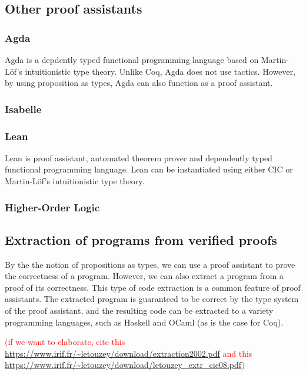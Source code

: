 \subsection{Other proof assistants}

\subsubsection{Agda}

Agda is a depdently typed functional programming language based on Martin-Löf's
intuitionistic type theory. Unlike Coq, Agda does not use tactics. \cite{agdatut}
However, by using proposition as types, Agda can also function as a proof assistant.

\subsubsection{Isabelle}

\subsubsection{Lean}

Lean is proof assistant, automated theorem prover and dependently typed functional programming language.
Lean can be instantiated using either CIC or Martin-Löf's intuitionistic type theory.
\cite{lean}

\subsubsection{Higher-Order Logic}

\subsection{Extraction of programs from verified proofs}

By the the notion of propositions as types, we can use a proof assistant to
prove the correctness of a program. However, we can also extract a program from
a proof of its correctness. This type of code extraction is a common feature of proof assistants.
The extracted program is guaranteed to be correct by the type system of the proof assistant,
and the resulting code can be extracted to a variety programming languages, such as Haskell and OCaml (as is the case for Coq).
\cite{cintro}


\textcolor{red}{(if we want to elaborate, cite this \url{https://www.irif.fr/~letouzey/download/extraction2002.pdf} and this \url{https://www.irif.fr/~letouzey/download/letouzey_extr_cie08.pdf})}
